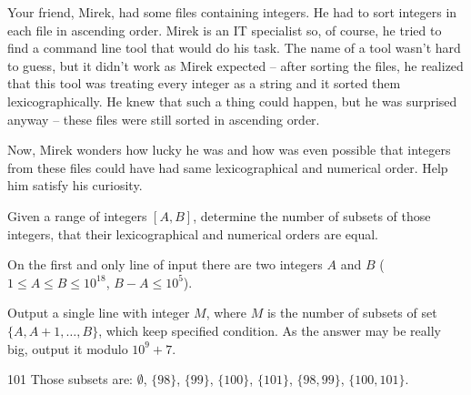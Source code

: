 





Your friend, Mirek, had some files containing integers.
He had to sort integers in each file in ascending order.
Mirek is an IT specialist so, of course, he tried to find a command line tool that would do his task.
The name of a tool wasn't hard to guess, but it didn't work as Mirek expected
	-- after sorting the files, he realized that this tool was treating every integer as a string
	and it sorted them lexicographically.
He knew that such a thing could happen,
	but he was surprised anyway
	-- these files were still sorted in ascending order.

Now, Mirek wonders how lucky he was and how was even possible that
	integers from these files could have had same lexicographical and numerical order.
Help him satisfy his curiosity.


Given a range of integers $[A, B]$, determine the number of subsets of those integers,
	that their lexicographical and numerical orders are equal.


On the first and only line of input there are two integers $A$ and $B$ ($1 \le A \le B \le 10^{18}$, $B - A \le 10^5$).


Output a single line with integer $M$, where $M$ is the number of subsets of set $\{A, A+1, \ldots, B\}$,
	which keep specified condition.
As the answer may be really big, output it modulo $10^9 + 7$.



 101
\sampleCOMMENT
Those subsets are: $\emptyset$, $\{98\}$, $\{99\}$, $\{100\}$, $\{101\}$, $\{98, 99\}$, $\{100, 101\}$.
\sampleEND



